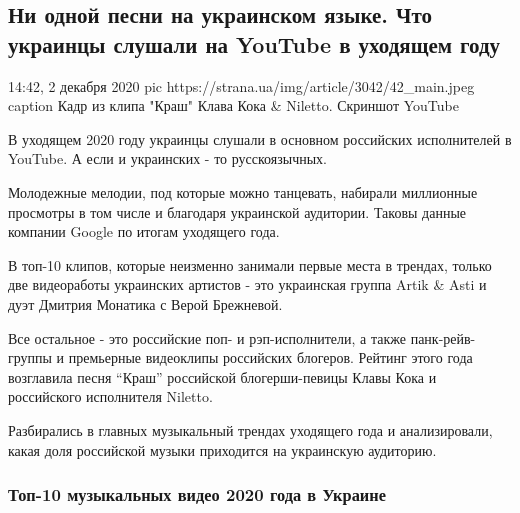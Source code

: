  
 
 
 
 

\subsection{Ни одной песни на украинском языке. Что украинцы слушали на YouTube в уходящем году}
\label{sec:02_12_2020.news.ua.strana.2.ukr_songs_youtube_stats}

14:42, 2 декабря 2020
\ifcmt
pic https://strana.ua/img/article/3042/42_main.jpeg
caption Кадр из клипа "Краш" Клава Кока \& Niletto. Скриншот YouTube 
\fi

В уходящем 2020 году украинцы слушали в основном российских исполнителей в
YouTube. А если и украинских - то русскоязычных.

Молодежные мелодии, под которые можно танцевать, набирали миллионные
просмотры в том числе и благодаря украинской аудитории. Таковы данные
компании Google по итогам уходящего года. 

В топ-10 клипов, которые неизменно занимали первые места в трендах, только
две видеоработы украинских артистов - это украинская группа Artik \& Asti и
дуэт Дмитрия Монатика с Верой Брежневой. 

Все остальное - это российские поп- и рэп-исполнители, а также панк-рейв-группы
и премьерные видеоклипы российских блогеров. Рейтинг этого года возглавила
песня \enquote{Краш} российской блогерши-певицы Клавы Кока и российского исполнителя
Niletto.

Разбирались в главных музыкальный трендах уходящего года и анализировали,
какая доля российской музыки приходится на украинскую аудиторию.

\subsubsection{Топ-10 музыкальных видео 2020 года в Украине}

